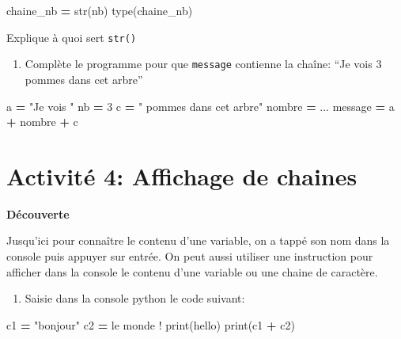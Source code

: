 \documentclass[
]{book}
\newenvironment{Shaded}{\begin{snugshade}}{\end{snugshade}}
\newcommand{\BuiltInTok}[1]{#1}
\newcommand{\DecValTok}[1]{\textcolor[rgb]{0.00,0.00,0.81}{#1}}
\newcommand{\NormalTok}[1]{#1}
\newcommand{\OperatorTok}[1]{\textcolor[rgb]{0.81,0.36,0.00}{\textbf{#1}}}
\newcommand{\StringTok}[1]{\textcolor[rgb]{0.31,0.60,0.02}{#1}}
\providecommand{\tightlist}{%
  \setlength{\itemsep}{0pt}\setlength{\parskip}{0pt}}
\def\tightlist{}
\begin{document}
\begin{Shaded}
\begin{Highlighting}[]
\NormalTok{chaine\_nb }\OperatorTok{=} \BuiltInTok{str}\NormalTok{(nb)}
\BuiltInTok{type}\NormalTok{(chaine\_nb)}
\end{Highlighting}
\end{Shaded}

Explique à quoi sert \texttt{str()}

\begin{enumerate}
\def\labelenumi{\arabic{enumi}.}
\setcounter{enumi}{5}
\tightlist
\item
  Complète le programme pour que \texttt{message} contienne la chaîne: ``Je vois 3 pommes dans cet arbre''
\end{enumerate}

\begin{Shaded}
\begin{Highlighting}[]
\NormalTok{a }\OperatorTok{=} \StringTok{"Je vois "}
\NormalTok{nb }\OperatorTok{=} \DecValTok{3}
\NormalTok{c }\OperatorTok{=} \StringTok{" pommes dans cet arbre"}
\NormalTok{nombre }\OperatorTok{=}\NormalTok{ ...}
\NormalTok{message }\OperatorTok{=}\NormalTok{ a }\OperatorTok{+}\NormalTok{ nombre }\OperatorTok{+}\NormalTok{ c}
\end{Highlighting}
\end{Shaded}

\newpage

\hypertarget{activituxe9-4-affichage-de-chaines}{%
\section{Activité 4: Affichage de chaines}\label{activituxe9-4-affichage-de-chaines}}

\textbf{Découverte}

Jusqu'ici pour connaître le contenu d'une variable, on a tappé son nom dans la console puis appuyer sur entrée. On peut aussi utiliser une instruction pour afficher dans la console le contenu d'une variable ou une chaine de caractère.

\begin{enumerate}
\def\labelenumi{\arabic{enumi}.}
\tightlist
\item
  Saisie dans la console python le code suivant:
\end{enumerate}

\begin{Shaded}
\begin{Highlighting}[]
\NormalTok{c1 }\OperatorTok{=} \StringTok{"bonjour"}
\NormalTok{c2 }\OperatorTok{=} \StringTok{\textquotesingle{} le monde !\textquotesingle{}}
\BuiltInTok{print}\NormalTok{(}\StringTok{\textquotesingle{}hello\textquotesingle{}}\NormalTok{)}
\BuiltInTok{print}\NormalTok{(c1 }\OperatorTok{+}\NormalTok{ c2)}
\end{Highlighting}
\end{Shaded}
\end{document}

